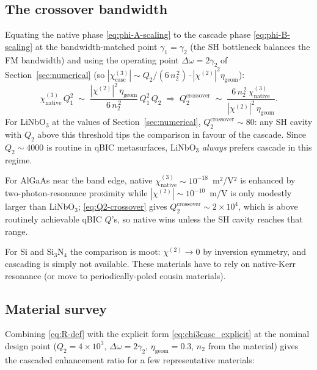\documentclass[11pt,a4paper]{article}
\newcommand{\chitwo}{\chi^{(2)}}
\newcommand{\chithree}{\chi^{(3)}}
\newcommand{\Dom}{\Delta\omega}
\begin{document}
\subsection*{The crossover bandwidth}

Equating the native phase \eqref{eq:phi-A-scaling} to the cascade
phase \eqref{eq:phi-B-scaling} at the bandwidth-matched point
$\gamma_1=\gamma_2$ (the SH bottleneck balances the FM bandwidth)
and using the operating point $\Dom=2\gamma_2$ of
Section~\ref{sec:numerical} (so $|\chithree_\text{casc}|\sim
Q_2/(6\,n_2^{\,2})\cdot|\chitwo|^{2}\eta_\text{geom}$):
\begin{equation}
  \chithree_\text{native}\,Q_1^{2}\;\sim\;
  \frac{|\chitwo|^{2}\,\eta_\text{geom}}{6\,n_2^{\,2}}\,Q_1^{2}\,Q_2
  \;\Longrightarrow\;
  Q_2^\text{crossover}\;\sim\;
       \frac{6\,n_2^{\,2}\,\chithree_\text{native}}{|\chitwo|^{2}\,\eta_\text{geom}}.
  \label{eq:Q2-crossover}
\end{equation}
For LiNbO$_3$ at the values of Section~\ref{sec:numerical},
$Q_2^\text{crossover}\sim 80$: any SH cavity with $Q_2$
above this threshold tips the comparison in favour of the cascade.
Since $Q_2 \sim 4000$ is routine in qBIC metasurfaces, LiNbO$_3$
\emph{always} prefers cascade in this regime.

For AlGaAs near the band edge, native $\chithree_\text{native}\sim
10^{-18}$~m$^{2}$/V$^{2}$ is enhanced by two-photon-resonance proximity
while $|\chitwo|\sim 10^{-10}$~m/V is only modestly larger than
LiNbO$_3$; \eqref{eq:Q2-crossover} gives $Q_2^\text{crossover}\sim
2\!\times\!10^{4}$, which is above routinely achievable qBIC $Q$'s, so
native wins unless the SH cavity reaches that range.

For Si and Si$_3$N$_4$ the comparison is moot: $\chitwo\to 0$ by
inversion symmetry, and cascading is simply not available.  These
materials have to rely on native-Kerr resonance (or move to
periodically-poled cousin materials).

\subsection*{Material survey}

Combining \eqref{eq:R-def} with the explicit form
\eqref{eq:chi3casc_explicit} at the nominal design point ($Q_2=
4{\times}10^{3}$, $\Dom=2\gamma_2$, $\eta_\text{geom}=0.3$, $n_2$ from
the material) gives the cascaded enhancement ratio for a few
representative materials:
\end{document}
